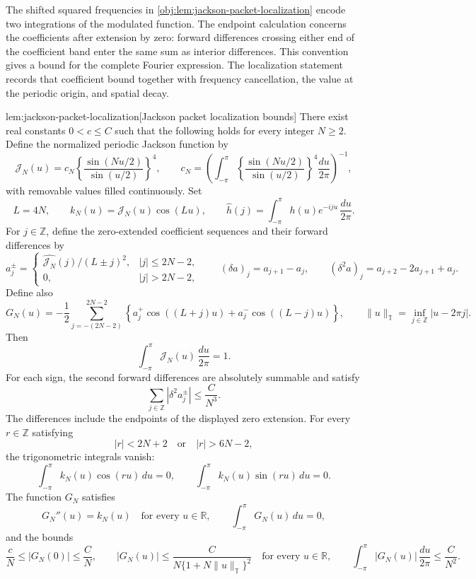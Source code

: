 \documentclass[11pt]{article}
\begin{document}
The shifted squared frequencies in \cref{obj:lem:jackson-packet-localization} encode two integrations of the modulated function. The endpoint calculation concerns the coefficients after extension by zero: forward differences crossing either end of the coefficient band enter the same sum as interior differences. This convention gives a bound for the complete Fourier expression. The localization statement records that coefficient bound together with frequency cancellation, the value at the periodic origin, and spatial decay.

\begin{lemmav}{lem:jackson-packet-localization}[Jackson packet localization bounds]
There exist real constants \(0<c\leq C\) such that the following holds for every integer \(N\geq2\). Define the normalized periodic Jackson function by
\[
\mathcal J_N(u)
=c_N\left\{\frac{\sin(Nu/2)}{\sin(u/2)}\right\}^{4},
\qquad
c_N=
\left(
\int_{-\pi}^{\pi}
\left\{\frac{\sin(Nu/2)}{\sin(u/2)}\right\}^{4}
\frac{du}{2\pi}
\right)^{-1},
\]
with removable values filled continuously. Set
\[
L=4N,\qquad
k_N(u)=\mathcal J_N(u)\cos(Lu),
\qquad
\widehat h(j)=\int_{-\pi}^{\pi}h(u)e^{-iju}\,\frac{du}{2\pi}.
\]
For \(j\in\mathbb Z\), define the zero-extended coefficient sequences and their forward differences by
\[
a_j^\pm=
\begin{cases}
\widehat{\mathcal J_N}(j)/(L\pm j)^2,& |j|\leq2N-2,\\
0,& |j|>2N-2,
\end{cases}
\qquad
(\delta a)_j=a_{j+1}-a_j,
\qquad
(\delta^2a)_j=a_{j+2}-2a_{j+1}+a_j.
\]
Define also
\[
G_N(u)
=-\frac12\sum_{j=-(2N-2)}^{2N-2}
\left\{
a_j^+\cos((L+j)u)+a_j^-\cos((L-j)u)
\right\},
\qquad
\|u\|_{\mathbb T}
=\inf_{j\in\mathbb Z}|u-2\pi j|.
\]
Then
\[
\int_{-\pi}^{\pi}\mathcal J_N(u)\,\frac{du}{2\pi}=1.
\]
For each sign, the second forward differences are absolutely summable and satisfy
\[
\sum_{j\in\mathbb Z}|\delta^2a_j^\pm|
\leq\frac{C}{N^3}.
\]
The differences include the endpoints of the displayed zero extension. For every \(r\in\mathbb Z\) satisfying
\[
|r|<2N+2\quad\text{or}\quad |r|>6N-2,
\]
the trigonometric integrals vanish:
\[
\int_{-\pi}^{\pi}k_N(u)\cos(ru)\,du=0,
\qquad
\int_{-\pi}^{\pi}k_N(u)\sin(ru)\,du=0.
\]
The function \(G_N\) satisfies
\[
G_N''(u)=k_N(u)\quad\text{for every }u\in\mathbb R,
\qquad
\int_{-\pi}^{\pi}G_N(u)\,du=0,
\]
and the bounds
\[
\frac{c}{N}\leq |G_N(0)|\leq\frac{C}{N},
\qquad
|G_N(u)|\leq
\frac{C}{N\{1+N\|u\|_{\mathbb T}\}^{2}}
\quad\text{for every }u\in\mathbb R,
\qquad
\int_{-\pi}^{\pi}|G_N(u)|\,\frac{du}{2\pi}
\leq\frac{C}{N^2}.
\]
\end{lemmav}
\end{document}
